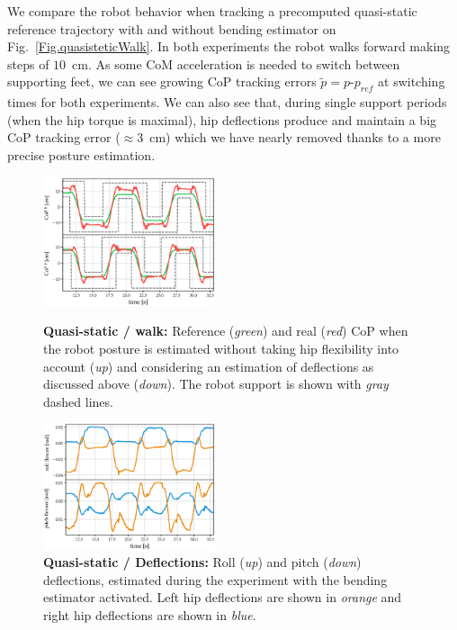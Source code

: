 \documentclass[letterpaper, 10 pt, conference]{ieeeconf}  %
\begin{document}
    We compare the robot behavior when tracking a precomputed quasi-static reference trajectory with and without bending estimator on Fig.~\ref{Fig.quasisteticWalk}. In both experiments the robot walks forward making steps of $10$~cm. As some CoM acceleration is needed to switch between supporting feet, we can see growing CoP tracking errors $\tilde{p} = p\texttt{-}p_\mathit{ref}$ at switching times for both experiments. We can also see that, during single support periods (when the hip torque is maximal), hip deflections produce and maintain a big CoP tracking error ($\approx 3$~cm) which we have nearly removed thanks to a more precise posture estimation. 
    
\begin{figure}[t!]
	\centering
	\includegraphics[trim={0 1mm 0 3mm},clip,width=0.45\textwidth]{images/quasisteticWalk.eps}
	\caption{\textbf{Quasi-static / walk:} Reference (\textit{green}) and real (\textit{red}) CoP when the robot posture is estimated without taking hip flexibility into account (\textit{up}) and considering an estimation of deflections as discussed above (\textit{down}). The robot support is shown with \textit{gray} dashed lines.} \label{Fig.quasisteticWalk}
    \vfill 
	\centering
	\includegraphics[trim={0 1mm 0 3mm},clip,width=0.45\textwidth]{images/quasistetic_flexure.eps}
	\caption{\textbf{Quasi-static / Deflections:} Roll (\textit{up}) and pitch (\textit{down}) deflections, estimated during the experiment with the bending estimator activated. Left hip deflections are shown in \textit{orange} and right hip deflections are shown in \textit{blue}.}
	\label{Fig:Quasi-Static-Deflections}
\end{figure} 
\end{document}
